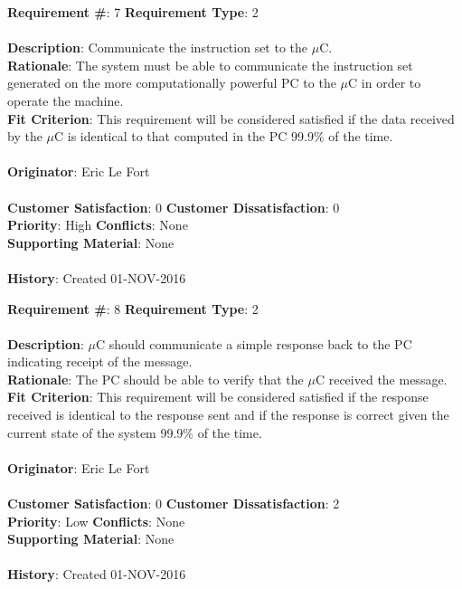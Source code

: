 \documentclass[titlepage]{article}
\begin{document}
\newpage
\begin{framed}
	\noindent\textbf{Requirement \#}: 7 \hfill \textbf{Requirement Type}: 2 \hfill\\\\
	\noindent\textbf{Description}: Communicate the instruction set to the $\mu$C.\\
	\textbf{Rationale}: The system must be able to communicate the instruction set generated on the more computationally powerful PC to the $\mu$C in order to operate the machine.\\
	\textbf{Fit Criterion}: This requirement will be considered satisfied if the data received by the $\mu$C is identical to that computed in the PC 99.9\% of the time.\\\\
	\textbf{Originator}: Eric Le Fort\\\\
	\noindent\textbf{Customer Satisfaction}: 0 \hfill 	\textbf{Customer Dissatisfaction}: 0 \hfill\\
	\textbf{Priority}: High \hfill \textbf{Conflicts}: None \hfill\\
	\textbf{Supporting Material}: None\\\\
	\noindent\textbf{History}: Created 01-NOV-2016
\end{framed}

\begin{framed}
	\noindent\textbf{Requirement \#}: 8 \hfill \textbf{Requirement Type}: 2 \hfill\\\\
	\noindent\textbf{Description}: $\mu$C should communicate a simple response back to the PC indicating receipt of the message.\\
	\textbf{Rationale}: The PC should be able to verify that the $\mu$C received the message.\\
	\textbf{Fit Criterion}: This requirement will be considered satisfied if the response received is identical to the response sent and if the response is correct given the current state of the system 99.9\% of the time.\\\\
	\textbf{Originator}: Eric Le Fort\\\\
	\noindent\textbf{Customer Satisfaction}: 0 \hfill 	\textbf{Customer Dissatisfaction}: 2 \hfill\\
	\textbf{Priority}: Low \hfill \textbf{Conflicts}: None \hfill\\
	\textbf{Supporting Material}: None\\\\
	\noindent\textbf{History}: Created 01-NOV-2016
\end{framed}
\end{document}
